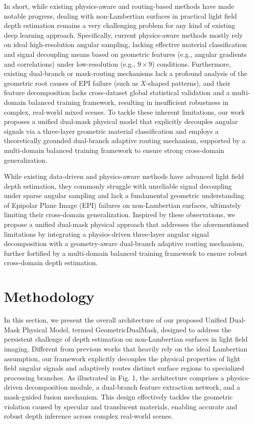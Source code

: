 \documentclass[lettersize,journal]{IEEEtran}
\begin{document}
In short, while existing physics-aware and routing-based methods have made notable progress, dealing with non-Lambertian surfaces in practical light field depth estimation remains a very challenging problem for any kind of existing deep learning approach. Specifically, current physics-aware methods mostly rely on ideal high-resolution angular sampling, lacking effective material classification and signal decoupling means based on geometric features (e.g., angular gradients and correlations) under low-resolution (e.g., $9 \times 9$) conditions. Furthermore, existing dual-branch or mask-routing mechanisms lack a profound analysis of the geometric root causes of EPI failure (such as $X$-shaped patterns), and their feature decomposition lacks cross-dataset global statistical validation and a multi-domain balanced training framework, resulting in insufficient robustness in complex, real-world mixed scenes. To tackle these inherent limitations, our work proposes a unified dual-mask physical model that explicitly decouples angular signals via a three-layer geometric material classification and employs a theoretically grounded dual-branch adaptive routing mechanism, supported by a multi-domain balanced training framework to ensure strong cross-domain generalization.

While existing data-driven and physics-aware methods have advanced light field depth estimation, they commonly struggle with unreliable signal decoupling under sparse angular sampling and lack a fundamental geometric understanding of Epipolar Plane Image (EPI) failures on non-Lambertian surfaces, ultimately limiting their cross-domain generalization. Inspired by these observations, we propose a unified dual-mask physical approach that addresses the aforementioned limitations by integrating a physics-driven three-layer angular signal decomposition with a geometry-aware dual-branch adaptive routing mechanism, further fortified by a multi-domain balanced training framework to ensure robust cross-domain depth estimation.

\section{Methodology}

In this section, we present the overall architecture of our proposed Unified Dual-Mask Physical Model, termed GeometricDualMask, designed to address the persistent challenge of depth estimation on non-Lambertian surfaces in light field imaging. Different from previous works that heavily rely on the ideal Lambertian assumption, our framework explicitly decouples the physical properties of light field angular signals and adaptively routes distinct surface regions to specialized processing branches. As illustrated in Fig. 1, the architecture comprises a physics-driven decomposition module, a dual-branch feature extraction network, and a mask-guided fusion mechanism. This design effectively tackles the geometric violation caused by specular and translucent materials, enabling accurate and robust depth inference across complex real-world scenes.
\end{document}
